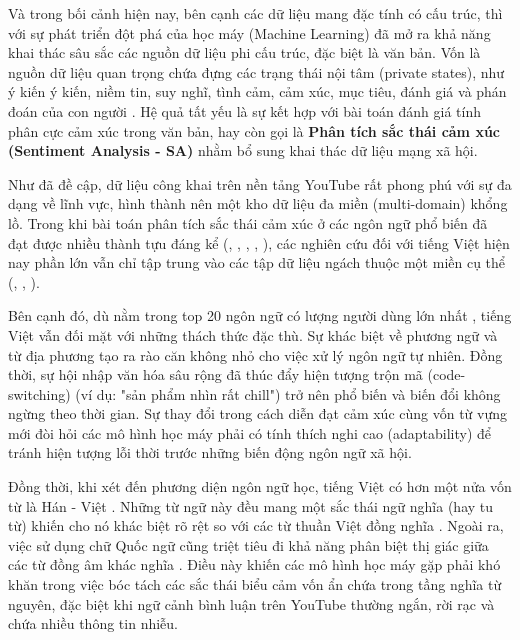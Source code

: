 \documentclass{article}[12pt]
\begin{document}
{    Và trong bối cảnh hiện nay, bên cạnh các dữ liệu mang đặc tính có cấu trúc, thì với sự phát triển đột phá của học máy (Machine Learning) đã mở ra khả năng khai thác sâu sắc các nguồn dữ liệu phi cấu trúc, đặc biệt là văn bản. Vốn là nguồn dữ liệu quan trọng chứa đựng các trạng thái nội tâm (private states), như ý kiến ý kiến, niềm tin, suy nghĩ, tình cảm, cảm xúc, mục tiêu, đánh giá và phán đoán của con người \cite{wiebe2005annotating}. Hệ quả tất yếu là sự kết hợp với bài toán đánh giá tính phân cực cảm xúc trong văn bản, hay còn gọi là \textbf{Phân tích sắc thái cảm xúc (Sentiment Analysis - SA)} nhằm bổ sung khai thác dữ liệu mạng xã hội.

    Như đã đề cập, dữ liệu công khai trên nền tảng YouTube rất phong phú với sự đa dạng về lĩnh vực, hình thành nên một kho dữ liệu đa miền (multi-domain) khổng lồ. Trong khi bài toán phân tích sắc thái cảm xúc ở các ngôn ngữ phổ biến đã đạt được nhiều thành tựu đáng kể (\cite{shen2025zero}, \cite{zhao2024multi}, \cite{lee2026dimabsa}, \cite{zhao2025interpretable}, \cite{guo2024mvindemo}), các nghiên cứu đối với tiếng Việt hiện nay phần lớn vẫn chỉ tập trung vào các tập dữ liệu ngách thuộc một miền cụ thể (\cite{nguyen2025like}, \cite{minh2024fine}, \cite{le2025hybrid}).

    Bên cạnh đó, dù nằm trong top 20 ngôn ngữ có lượng người dùng lớn nhất \cite{Ethnologue2026}, tiếng Việt vẫn đối mặt với những thách thức đặc thù. Sự khác biệt về phương ngữ và từ địa phương tạo ra rào căn không nhỏ cho việc xử lý ngôn ngữ tự nhiên. Đồng thời, sự hội nhập văn hóa sâu rộng đã thúc đẩy hiện tượng trộn mã (code-switching) (ví dụ: "sản phẩm nhìn rất chill") trở nên phổ biến và biến đổi không ngừng theo thời gian. Sự thay đổi trong cách diễn đạt cảm xúc cùng vốn từ vựng mới đòi hỏi các mô hình học máy phải có tính thích nghi cao (adaptability) để tránh hiện tượng lỗi thời trước những biến động ngôn ngữ xã hội.

    Đồng thời, khi xét đến phương diện ngôn ngữ học, tiếng Việt có hơn một nửa vốn từ là Hán - Việt \cite{phanngoc2000}. Những từ ngữ này đều mang một sắc thái ngữ nghĩa (hay tu từ) khiến cho nó khác biệt rõ rệt so với các từ thuần Việt đồng nghĩa \cite{cao2003tiengviet}. Ngoài ra, việc sử dụng chữ Quốc ngữ cũng triệt tiêu đi khả năng phân biệt thị giác giữa các từ đồng âm khác nghĩa \cite{cao2003tiengviet}. Điều này khiến các mô hình học máy gặp phải khó khăn trong việc bóc tách các sắc thái biểu cảm vốn ẩn chứa trong tầng nghĩa từ nguyên, đặc biệt khi ngữ cảnh bình luận trên YouTube thường ngắn, rời rạc và chứa nhiều thông tin nhiễu.
    
}
\end{document}
